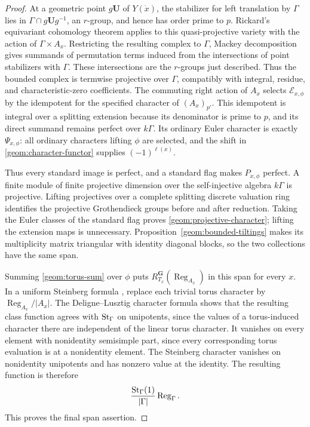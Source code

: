 \begin{proof}
At a geometric point \(g\mathbf U\) of \(Y(\dot x)\), the stabilizer
for left translation by \(\Gamma\) lies in
\(\Gamma\cap g\mathbf U g^{-1}\), an \(r\)-group, and hence has order
prime to \(p\). Rickard's equivariant cohomology theorem
\cite[Theorems 3.2 and 3.5]{RickardEtale} applies to this
quasi-projective variety with the action of \(\Gamma\times A_x\).
Restricting the resulting complex to \(\Gamma\), Mackey decomposition
gives summands of permutation terms induced from the intersections of point
stabilizers with \(\Gamma\). These intersections are the \(r\)-groups
just described. Thus the bounded complex is termwise projective
over \(\Gamma\), compatibly with integral, residue, and
characteristic-zero coefficients. The commuting right action of
\(A_x\) selects \(\mathcal E_{x,\phi}\) by the idempotent for the
specified character of \((A_x)_{p'}\). This idempotent is integral
over a splitting extension because its denominator is prime to
\(p\), and its direct summand remains perfect over \(k\Gamma\).
Its ordinary Euler character is exactly
\(\Psi_{x,\phi}\): all ordinary characters lifting \(\phi\) are
selected, and the shift in \eqref{geom:character-functor} supplies
\((-1)^{\ell(x)}\).

Thus every standard image is perfect, and a standard flag makes
\(P_{x,\phi}\) perfect. A finite module of finite projective dimension
over the self-injective algebra \(k\Gamma\) is projective. Lifting
projectives over a complete splitting discrete valuation ring
identifies the projective Grothendieck groups before and after
reduction. Taking the Euler classes of the standard flag proves
\eqref{geom:projective-character}; lifting the extension maps is
unnecessary. Proposition~\ref{geom:bounded-tiltings} makes its
multiplicity matrix triangular with identity diagonal blocks, so the
two collections have the same span.

Summing \eqref{geom:torus-sum} over \(\phi\) puts
\(R_{T_x}^{\mathbf G}(\operatorname{Reg}_{A_x})\) in this span for
every \(x\). In a uniform Steinberg formula
\cite[Corollary 7.14, formula (7.14.2), and Section 11]{DL}, replace
each trivial torus character by
\(\operatorname{Reg}_{A_x}/|A_x|\). The Deligne--Lusztig character
formula \cite[Theorem 4.2 and Section 11]{DL} shows that the resulting
class function agrees with \(\operatorname{St}_\Gamma\) on unipotents, since the
values of a torus-induced character there are independent of the
linear torus character. It vanishes on every element with nonidentity
semisimple part, since every corresponding torus evaluation is at a
nonidentity element. The Steinberg character vanishes on nonidentity
unipotents and has nonzero value at the identity. The resulting
function is therefore
\[
 \frac{\operatorname{St}_\Gamma(1)}{|\Gamma|}\operatorname{Reg}_\Gamma.
\]
This proves the final span assertion.
\end{proof}

